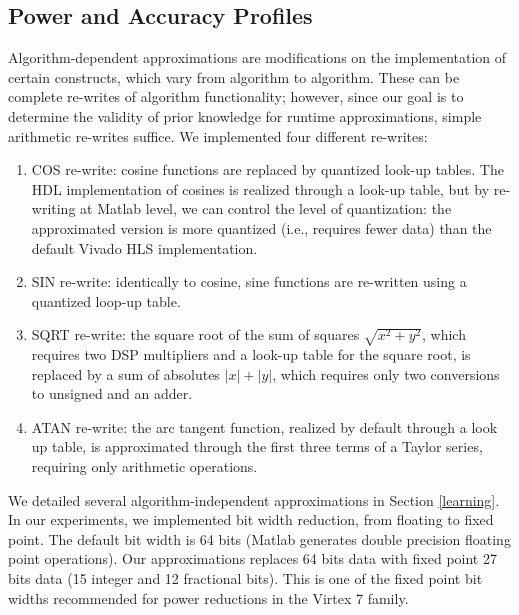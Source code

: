 \subsection{Power and Accuracy Profiles}\label{subsec:profiles}

Algorithm-dependent approximations are modifications on the implementation of certain constructs, which vary from algorithm to algorithm. These can be complete re-writes of algorithm functionality; however, since our goal is to determine the validity of prior knowledge for runtime approximations, simple arithmetic re-writes suffice. We implemented four different re-writes:

\begin{enumerate}
\item COS re-write: cosine functions are replaced by quantized look-up tables. The HDL implementation of cosines is realized through a look-up table, but by re-writing at Matlab level, we can control the level of quantization: the approximated version is more quantized (i.e., requires fewer data) than the default Vivado HLS implementation.
\item SIN re-write: identically to cosine, sine functions are re-written using a quantized loop-up table.
\item SQRT re-write: the square root of the sum of squares $\sqrt{x^2+y^2}$, which requires two DSP multipliers and a look-up table for the square root, is replaced by a sum of absolutes $\left| x\right|+\left| y\right|$, which requires only two conversions to unsigned and an adder.
\item ATAN re-write: the arc tangent function, realized by default through a look up table, is approximated through the first three terms of a Taylor series, requiring only arithmetic operations.
\end{enumerate}

\par We detailed several algorithm-independent approximations in Section \ref{learning}. In our experiments, we implemented bit width reduction, from floating to fixed point. The default bit width is 64 bits (Matlab generates double precision floating point operations). Our approximations replaces 64 bits data with fixed point 27 bits data (15 integer and 12 fractional bits). This is one of the fixed point bit widths recommended for power reductions in the Virtex 7 family. 

